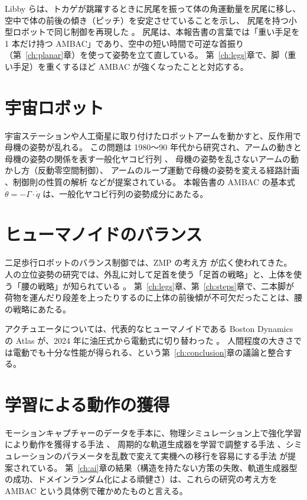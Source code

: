 Libby らは、トカゲが跳躍するときに尻尾を振って体の角運動量を尻尾に移し、空中で体の前後の傾き（ピッチ）を安定させていることを示し、
尻尾を持つ小型ロボットで同じ制御を再現した \cite{R45}。
尻尾は、本報告書の言葉では「重い手足を 1 本だけ持つ AMBAC」であり、空中の短い時間で可逆な首振り（第~\ref{ch:planar}章）を使って姿勢を立て直している。
第~\ref{ch:legs}章で、脚（重い手足）を重くするほど AMBAC が強くなったことと対応する。

\section{宇宙ロボット}

宇宙ステーションや人工衛星に取り付けたロボットアームを動かすと、反作用で母機の姿勢が乱れる。
この問題は 1980〜90 年代から研究され、アームの動きと母機の姿勢の関係を表す一般化ヤコビ行列 \cite{R14}、
母機の姿勢を乱さないアームの動かし方（反動零空間制御）\cite{R15}、
アームのループ運動で母機の姿勢を変える経路計画 \cite{R12}、制御則の性質の解析 \cite{R13} などが提案されている。
本報告書の AMBAC の基本式 $\dot\theta=-\Gamma\cdot\dot q$ は、一般化ヤコビ行列の姿勢成分にあたる。

\section{ヒューマノイドのバランス}

二足歩行ロボットのバランス制御では、ZMP の考え方 \cite{R28} が広く使われてきた。
人の立位姿勢の研究では、外乱に対して足首を使う「足首の戦略」と、上体を使う「腰の戦略」が知られている \cite{R31}。
第~\ref{ch:legs}章、第~\ref{ch:steps}章で、二本脚が荷物を運んだり段差を上ったりするのに上体の前後傾が不可欠だったことは、腰の戦略にあたる。

アクチュエータについては、代表的なヒューマノイドである Boston Dynamics の Atlas が、2024 年に油圧式から電動式に切り替わった \cite{R47}。
人間程度の大きさでは電動でも十分な性能が得られる、という第~\ref{ch:conclusion}章の議論と整合する。

\section{学習による動作の獲得}

モーションキャプチャーのデータを手本に、物理シミュレーション上で強化学習により動作を獲得する手法 \cite{R24}、
周期的な軌道生成器を学習で調整する手法 \cite{R21}、シミュレーションのパラメータを乱数で変えて実機への移行を容易にする手法 \cite{R23} が提案されている。
第~\ref{ch:ai}章の結果（構造を持たない方策の失敗、軌道生成器型の成功、ドメインランダム化による頑健さ）は、これらの研究の考え方を AMBAC という具体例で確かめたものと言える。

